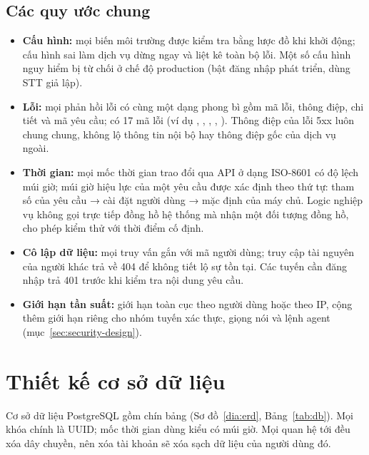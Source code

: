 \subsection{Các quy ước chung}
\begin{itemize}
  \item \textbf{Cấu hình:} mọi biến môi trường được kiểm tra bằng lược đồ khi khởi động; cấu hình sai làm dịch vụ dừng ngay và liệt kê toàn bộ lỗi. Một số cấu hình nguy hiểm bị từ chối ở chế độ production (bật đăng nhập phát triển, dùng STT giả lập).
  \item \textbf{Lỗi:} mọi phản hồi lỗi có cùng một dạng phong bì gồm mã lỗi, thông điệp, chi tiết và mã yêu cầu; có 17 mã lỗi (ví dụ , , , , ). Thông điệp của lỗi 5xx luôn chung chung, không lộ thông tin nội bộ hay thông điệp gốc của dịch vụ ngoài.
  \item \textbf{Thời gian:} mọi mốc thời gian trao đổi qua API ở dạng ISO-8601 có độ lệch múi giờ; múi giờ hiệu lực của một yêu cầu được xác định theo thứ tự: tham số của yêu cầu → cài đặt người dùng → mặc định của máy chủ. Logic nghiệp vụ không gọi trực tiếp đồng hồ hệ thống mà nhận một đối tượng đồng hồ, cho phép kiểm thử với thời điểm cố định.
  \item \textbf{Cô lập dữ liệu:} mọi truy vấn gắn với mã người dùng; truy cập tài nguyên của người khác trả về 404 để không tiết lộ sự tồn tại. Các tuyến cần đăng nhập trả 401 trước khi kiểm tra nội dung yêu cầu.
  \item \textbf{Giới hạn tần suất:} giới hạn toàn cục theo người dùng hoặc theo IP, cộng thêm giới hạn riêng cho nhóm tuyến xác thực, giọng nói và lệnh agent (mục~\ref{sec:security-design}).
\end{itemize}

\section{Thiết kế cơ sở dữ liệu}
Cơ sở dữ liệu PostgreSQL gồm chín bảng (Sơ đồ~\ref{dia:erd}, Bảng~\ref{tab:db}). Mọi khóa chính là UUID; mốc thời gian dùng kiểu có múi giờ. Mọi quan hệ tới  đều xóa dây chuyền, nên xóa tài khoản sẽ xóa sạch dữ liệu của người dùng đó.

